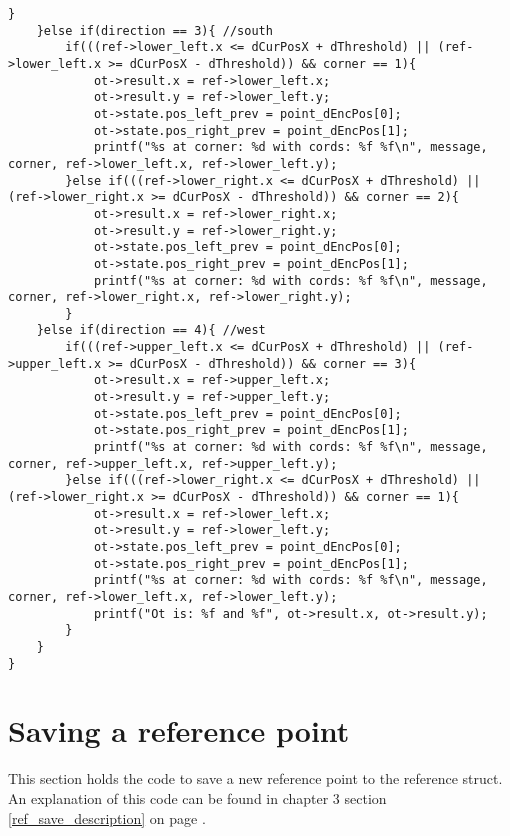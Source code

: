 \begin{lstlisting}[caption={Function which checks if a reference point has been reached}]
		}
	}else if(direction == 3){ //south
		if(((ref->lower_left.x <= dCurPosX + dThreshold) || (ref->lower_left.x >= dCurPosX - dThreshold)) && corner == 1){
			ot->result.x = ref->lower_left.x;
			ot->result.y = ref->lower_left.y;
			ot->state.pos_left_prev = point_dEncPos[0];
			ot->state.pos_right_prev = point_dEncPos[1]; 
			printf("%s at corner: %d with cords: %f %f\n", message, corner, ref->lower_left.x, ref->lower_left.y);
		}else if(((ref->lower_right.x <= dCurPosX + dThreshold) || (ref->lower_right.x >= dCurPosX - dThreshold)) && corner == 2){
			ot->result.x = ref->lower_right.x;
			ot->result.y = ref->lower_right.y;
			ot->state.pos_left_prev = point_dEncPos[0];
			ot->state.pos_right_prev = point_dEncPos[1];
			printf("%s at corner: %d with cords: %f %f\n", message, corner, ref->lower_right.x, ref->lower_right.y);
		}
	}else if(direction == 4){ //west
		if(((ref->upper_left.x <= dCurPosX + dThreshold) || (ref->upper_left.x >= dCurPosX - dThreshold)) && corner == 3){
			ot->result.x = ref->upper_left.x;
			ot->result.y = ref->upper_left.y;
			ot->state.pos_left_prev = point_dEncPos[0];
			ot->state.pos_right_prev = point_dEncPos[1]; 
			printf("%s at corner: %d with cords: %f %f\n", message, corner, ref->upper_left.x, ref->upper_left.y);
		}else if(((ref->lower_right.x <= dCurPosX + dThreshold) || (ref->lower_right.x >= dCurPosX - dThreshold)) && corner == 1){
			ot->result.x = ref->lower_left.x;
			ot->result.y = ref->lower_left.y;
			ot->state.pos_left_prev = point_dEncPos[0];
			ot->state.pos_right_prev = point_dEncPos[1]; 
			printf("%s at corner: %d with cords: %f %f\n", message, corner, ref->lower_left.x, ref->lower_left.y);
			printf("Ot is: %f and %f", ot->result.x, ot->result.y);
		}
	}
}
\end{lstlisting}

\section{Saving a reference point}
\label{ref_save_code}
This section holds the code to save a new reference point to the reference struct.
An explanation of this code can be found in chapter 3 section \ref{ref_save_description} on page \pageref{ref_save_description}.

